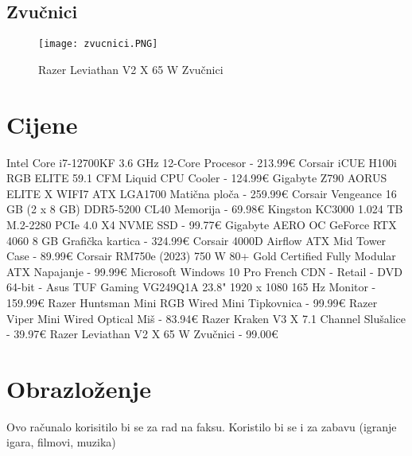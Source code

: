 \documentclass{report}
\begin{document}
\subsection{Zvučnici}
\begin{figure}[h]
    \texttt{[image: zvucnici.PNG]}
    \caption{Razer Leviathan V2 X 65 W Zvučnici}
\end{figure}

\section{Cijene}
Intel Core i7-12700KF 3.6 GHz 12-Core Procesor - 213.99€
Corsair iCUE H100i RGB ELITE 59.1 CFM Liquid CPU Cooler - 124.99€
Gigabyte Z790 AORUS ELITE X WIFI7 ATX LGA1700 Matična ploča - 259.99€
Corsair Vengeance 16 GB (2 x 8 GB) DDR5-5200 CL40 Memorija - 69.98€
Kingston KC3000 1.024 TB M.2-2280 PCIe 4.0 X4 NVME SSD - 99.77€
Gigabyte AERO OC GeForce RTX 4060 8 GB Grafička kartica - 324.99€
Corsair 4000D Airflow ATX Mid Tower Case - 89.99€
Corsair RM750e (2023) 750 W 80+ Gold Certified Fully Modular ATX Napajanje - 99.99€
Microsoft Windows 10 Pro French CDN - Retail - DVD 64-bit - 
Asus TUF Gaming VG249Q1A 23.8" 1920 x 1080 165 Hz Monitor - 159.99€
Razer Huntsman Mini RGB Wired Mini Tipkovnica - 99.99€
Razer Viper Mini Wired Optical Miš - 83.94€
Razer Kraken V3 X 7.1 Channel Slušalice - 39.97€
Razer Leviathan V2 X 65 W Zvučnici - 99.00€

\section{Obrazloženje}
Ovo računalo korisitilo bi se za rad na faksu. Koristilo bi se i za zabavu (igranje igara, filmovi, muzika)
\end{document}
